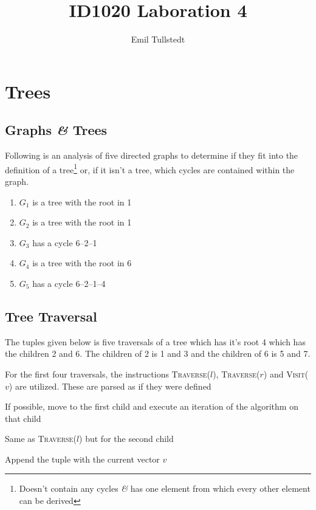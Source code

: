 \documentclass[a4paper,11pt]{article}
\title{ID1020 Laboration 4}
\author{Emil Tullstedt}
\begin{document}
\maketitle

\newpage

\tableofcontents

\newpage

\section{Trees}
\label{sec:trees}

\subsection{Graphs \textit{\&} Trees}

Following is an analysis of five directed graphs to determine if they fit into the definition of a tree\footnote{Doesn't contain any cycles \textit{\&} has one element from which every other element can be derived} or, if it isn't a tree, which cycles are contained within the graph.

\begin{enumerate}[label=\bfseries Graph \arabic*:]
\item $G_1$ is a tree with the root in 1
\item $G_2$ is a tree with the root in 1
\item $G_3$ has a cycle 6--2--1
\item $G_4$ is a tree with the root in 6
\item $G_5$ has a cycle 6--2--1--4
\end{enumerate}
\newpage
\subsection{Tree Traversal}

The tuples given below is five traversals of a tree which has it's root 4 which has the children 2 and 6. The children of 2 is 1 and 3 and the children of 6 is 5 and 7.

For the first four traversals, the instructions \textsc{Traverse}($l$), \textsc{Traverse}($r$) and \textsc{Visit}($v$) are utilized. These are parsed as if they were defined

\begin{description}[style=multiline,leftmargin=3cm]
\item[\textsc{Traverse}($l$)] If possible, move to the first child and execute an iteration of the algorithm on that child
\item[\textsc{Traverse}($r$)] Same as \textsc{Traverse}($l$) but for the second child
\item[\textsc{Visit}($v$)] Append the tuple with the current vector $v$
\end{description}
\end{document}
